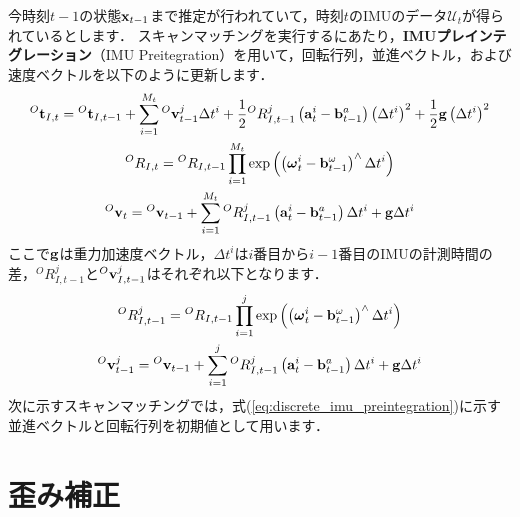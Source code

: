 今時刻$t-1$の状態${\bf x}_{t-1}$まで推定が行われていて，時刻$t$のIMUのデータ$\mathcal{U}_{t}$が得られているとします．
スキャンマッチングを実行するにあたり，{\bf IMUプレインテグレーション}（IMU Preitegration）を用いて，回転行列，並進ベクトル，および速度ベクトルを以下のように更新します．
%
\begin{align}
  \begin{gathered}
    {}^{O}{\bf t}_{I, t} = {}^{O}{\bf t}_{I, t-1} + \sum_{i=1}^{M_{t}} {}^{O}{\bf v}_{t-1}^{j} \Delta t^{i} + \frac{1}{2} {}^{O}R_{I, t-1}^{j} \left( {\bf a}_{t}^{i} - {\bf b}_{t-1}^{a} \right) \left( \Delta t^{i} \right)^{2} + \frac{1}{2} {\bf g} \left( \Delta t^{i} \right)^{2} \\
%
    {}^{O}R_{I, t} = {}^{O}R_{I, t-1} \prod_{i=1}^{M_{t}} \exp \left( \left( \boldsymbol \omega_{t}^{i} - {\bf b}_{t-1}^{\omega} \right)^{\wedge} \Delta t^{i} \right) \\
%
    {}^{O}{\bf v}_{t} = {}^{O}{\bf v}_{t-1} + \sum_{i=1}^{M_{t}} {}^{O}R_{I, t-1}^{j} \left( {\bf a}_{t}^{i} - {\bf b}_{t-1}^{a} \right) \Delta t^{i} + {\bf g} \Delta t^{i} \\
  \end{gathered}
  \label{eq:discrete_imu_preintegration}
\end{align}
%
ここで${\bf g}$は重力加速度ベクトル，$\Delta t^{i}$は$i$番目から$i-1$番目のIMUの計測時間の差，${}^{O}R_{I, t-1}^{j}$と${}^{O}{\bf v}_{I, t-1}^{j}$はそれぞれ以下となります．
\begin{align}
  \begin{gathered}
    {}^{O}R_{I, t-1}^{j} = {}^{O}R_{I, t-1} \prod_{i=1}^{j} \exp \left( \left( \boldsymbol \omega_{t}^{i} - {\bf b}_{t-1}^{\omega} \right)^{\wedge} \Delta t^{i} \right) \\
%
    {}^{O}{\bf v}_{t-1}^{j} = {}^{O}{\bf v}_{t-1} + \sum_{i=1}^{j} {}^{O}R_{I, t-1}^{j} \left( {\bf a}_{t}^{i} - {\bf b}_{t-1}^{a} \right) \Delta t^{i} + {\bf g} \Delta t^{i} \\
  \end{gathered}
\end{align}
%
次に示すスキャンマッチングでは，式(\ref{eq:discrete_imu_preintegration})に示す並進ベクトルと回転行列を初期値として用います．
















\section{歪み補正}
\label{subsec:deskew_scan_distortion}

